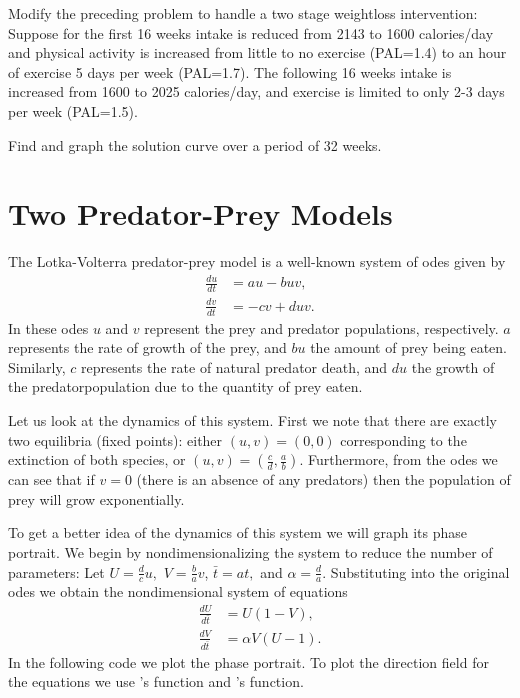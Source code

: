 \begin{problem}
Modify the preceding problem to handle a two stage weightloss intervention:
Suppose for the first 16 weeks intake is reduced from 2143 to 1600 calories/day and physical activity is increased from little to no exercise (PAL=1.4) to an hour of exercise 5 days per week (PAL=1.7).
The following 16 weeks intake is increased from 1600 to 2025 calories/day, and exercise is limited to only 2-3 days per week (PAL=1.5).

Find and graph the solution curve over a period of 32 weeks.
\end{problem}

\section*{Two Predator-Prey Models}
The Lotka-Volterra predator-prey model is a well-known 
system of odes given by 
\begin{align*}
	\frac{du}{dt} &= au - buv,\\
	\frac{dv}{dt} &= -cv + duv.
\end{align*}
In these odes $u$ and $v$ represent the prey and predator populations, respectively. $a$ represents the rate of growth of the prey, and $bu$ the amount of prey being eaten.
Similarly, $c$ represents the rate of natural predator death, and $du$ the growth of the predatorpopulation due to the quantity of prey eaten.

Let us look at the dynamics of this system.
First we note that there are exactly two equilibria (fixed points): either $(u,v) = (0,0)$ corresponding to the extinction of both species, or $(u,v) = (\frac{c}{d},\frac{a}{b})$.
Furthermore, from the odes we can see that if $v=0$ (there is an absence of any predators) then the population of prey will grow exponentially.

To get a better idea of the dynamics of this system we will graph its phase portrait.
We begin by nondimensionalizing the system to reduce the number of parameters:
Let $U = \frac{d}{c}u,$ $V = \frac{b}{a}v$, $\bar{t} = at,$ and $\alpha = \frac{d}{a}$.
Substituting into the original odes we obtain the nondimensional system of equations
\begin{align*}
	\frac{dU}{d\bar{t}} &= U(1-V),\\
	\frac{dV}{d\bar{t}} &= \alpha V (U-1).
\end{align*}
In the following code we plot the phase portrait.
To plot the direction field for the equations we use 's  function and 's  function.

